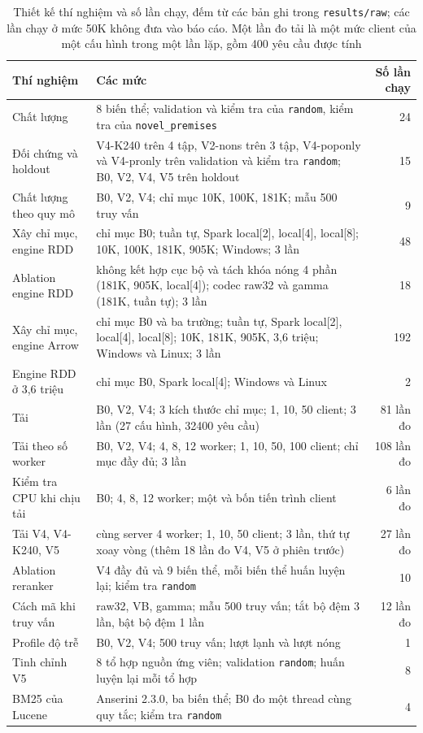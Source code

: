 \documentclass[11pt,a4paper,oneside]{report}
\newcommand{\code}[1]{\texttt{#1}}
\begin{document}
\begin{table}[htbp]
\centering
\caption[Thiết kế thí nghiệm]{Thiết kế thí nghiệm và số lần chạy, đếm từ các bản ghi trong \code{results/raw}; các lần
chạy ở mức 50K không đưa vào báo cáo. Một lần đo
tải là một mức client của một cấu hình trong một lần lặp, gồm 400 yêu cầu được tính}\label{tab:design}
\begin{tabularx}{\linewidth}{@{}lXr@{}}
\toprule
Thí nghiệm & Các mức & Số lần chạy \\
\midrule
Chất lượng & 8 biến thể; validation và kiểm tra của \code{random}, kiểm tra của \code{novel\_premises} & 24 \\
Đối chứng và holdout & V4-K240 trên 4 tập, V2-nons trên 3 tập, V4-poponly và V4-pronly trên validation và kiểm tra \code{random}; B0, V2, V4, V5 trên holdout & 15 \\
Chất lượng theo quy mô & B0, V2, V4; chỉ mục 10K, 100K, 181K; mẫu 500 truy vấn & 9 \\
Xây chỉ mục, engine RDD & chỉ mục B0; tuần tự, Spark local[2], local[4], local[8]; 10K, 100K, 181K, 905K; Windows; 3 lần & 48 \\
Ablation engine RDD & không kết hợp cục bộ và tách khóa nóng 4 phần (181K, 905K, local[4]); codec raw32 và gamma (181K, tuần tự); 3 lần & 18 \\
Xây chỉ mục, engine Arrow & chỉ mục B0 và ba trường; tuần tự, Spark local[2], local[4], local[8]; 10K, 181K, 905K, 3,6 triệu; Windows và Linux; 3 lần & 192 \\
Engine RDD ở 3,6 triệu & chỉ mục B0, Spark local[4]; Windows và Linux & 2 \\
Tải & B0, V2, V4; 3 kích thước chỉ mục; 1, 10, 50 client; 3 lần (27 cấu hình, \num{32400} yêu cầu) & 81 lần đo \\
Tải theo số worker & B0, V2, V4; 4, 8, 12 worker; 1, 10, 50, 100 client; chỉ mục đầy đủ; 3 lần & 108 lần đo \\
Kiểm tra CPU khi chịu tải & B0; 4, 8, 12 worker; một và bốn tiến trình client & 6 lần đo \\
Tải V4, V4-K240, V5 & cùng server 4 worker; 1, 10, 50 client; 3 lần, thứ tự xoay vòng (thêm 18 lần đo V4, V5 ở phiên trước) & 27 lần đo \\
Ablation reranker & V4 đầy đủ và 9 biến thể, mỗi biến thể huấn luyện lại; kiểm tra \code{random} & 10 \\
Cách mã khi truy vấn & raw32, VB, gamma; mẫu 500 truy vấn; tắt bộ đệm 3 lần, bật bộ đệm 1 lần & 12 lần đo \\
Profile độ trễ & B0, V2, V4; 500 truy vấn; lượt lạnh và lượt nóng & 1 \\
Tinh chỉnh V5 & 8 tổ hợp nguồn ứng viên; validation \code{random}; huấn luyện lại mỗi tổ hợp & 8 \\
BM25 của Lucene & Anserini 2.3.0, ba biến thể; B0 đo một thread cùng quy tắc; kiểm tra \code{random} & 4 \\
\bottomrule
\end{tabularx}
\end{table}
\end{document}
